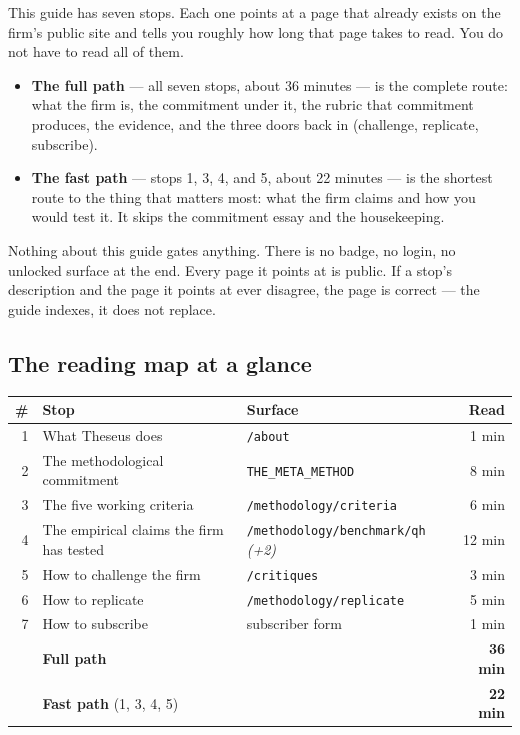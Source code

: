 \documentclass[11pt,letterpaper]{article}
\newcommand{\surface}[1]{\texttt{#1}}
\begin{document}
This guide has seven stops. Each one points at a page that already exists on the firm's public site and tells you roughly how long that page takes to read. You do not have to read all of them.

\begin{itemize}[leftmargin=*,itemsep=0.3em]
  \item \textbf{The full path} --- all seven stops, about 36 minutes --- is the complete route: what the firm is, the commitment under it, the rubric that commitment produces, the evidence, and the three doors back in (challenge, replicate, subscribe).
  \item \textbf{The fast path} --- stops 1, 3, 4, and 5, about 22 minutes --- is the shortest route to the thing that matters most: what the firm claims and how you would test it. It skips the commitment essay and the housekeeping.
\end{itemize}

Nothing about this guide gates anything. There is no badge, no login, no unlocked surface at the end. Every page it points at is public. If a stop's description and the page it points at ever disagree, the page is correct --- the guide indexes, it does not replace.

\vspace{1em}

\subsection*{The reading map at a glance}

\begin{longtable}{@{}r p{6.4cm} p{3.4cm} r@{}}
\toprule
\textbf{\#} & \textbf{Stop} & \textbf{Surface} & \textbf{Read} \\
\midrule
\endhead
1 & What Theseus does & \surface{/about} & 1 min \\
2 & The methodological commitment & \surface{THE\_META\_METHOD} & 8 min \\
3 & The five working criteria & \surface{/methodology/criteria} & 6 min \\
4 & The empirical claims the firm has tested & \surface{/methodology/benchmark/qh} \emph{(+2)} & 12 min \\
5 & How to challenge the firm & \surface{/critiques} & 3 min \\
6 & How to replicate & \surface{/methodology/replicate} & 5 min \\
7 & How to subscribe & subscriber form & 1 min \\
\midrule
 & \textbf{Full path} & & \textbf{36 min} \\
 & \textbf{Fast path} (1, 3, 4, 5) & & \textbf{22 min} \\
\bottomrule
\end{longtable}
\end{document}
